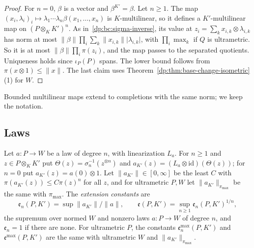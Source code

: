 \documentclass[11pt]{amsart}
\theoremstyle{definition}
\theoremstyle{remark}
\numberwithin{equation}{section}
\newcommand{\id}{\mathrm{id}}
\newcommand{\abs}[1]{\lvert #1\rvert}
\newcommand{\norm}[1]{\lVert #1\rVert}
\theoremstyle{plain}
\theoremstyle{definition}
\theoremstyle{plain}
\begin{document}
\begin{proof}
For $n=0$, $\beta$ is a vector and $\beta^{K'}=\beta$. Let $n\ge1$. The map $(x_i,\lambda_i)_i\mapsto\lambda_1\cdots\lambda_n\beta(x_1,\dots,x_n)$ is $K$-multilinear, so it defines a $K'$-multilinear map on $(P\otimes_KK')^n$. As in~\eqref{dp:bc:sigma-inverse}, its value at $z_i=\sum_kx_{i,k}\otimes\lambda_{i,k}$ has norm at most $\norm\beta\prod_i\sum_k\norm{x_{i,k}}\abs{\lambda_{i,k}}$, with $\prod_i\max_k$ if $Q$ is ultrametric. So it is at most $\norm\beta\prod_i\pi(z_i)$, and the map passes to the separated quotients. Uniqueness holds since $\iota_P(P)$ spans. The lower bound follows from $\pi(x\otimes1)\le\norm x$. The last claim uses Theorem~\ref{dp:thm:base-change-isometric}(1) for $W$.
\end{proof}

Bounded multilinear maps extend to completions with the same norm; we keep the notation.

\subsection{Laws}

Let $a\colon P\to W$ be a law of degree $n$, with linearization $L_a$. For $n\ge1$ and $z\in P\otimes_KK'$ put $\Theta(z)=\sigma_n^{-1}(z^{\otimes n})$ and $a_{K'}(z)=(L_a\otimes\id)(\Theta(z))$; for $n=0$ put $a_{K'}(z)=a(0)\otimes1$. Let $\norm{a_{K'}}\in[0,\infty]$ be the least $C$ with $\pi(a_{K'}(z))\le C\pi(z)^n$ for all $z$, and for ultrametric $P,W$ let $\norm{a_{K'}}_{\pi_{\max}}$ be the same with $\pi_{\max}$. The \emph{extension constants} are
\[
 \mathfrak e_n(P,K')=\sup\norm{a_{K'}}/\norm a,\qquad\mathfrak e(P,K')=\sup_{n\ge1}\mathfrak e_n(P,K')^{1/n},
\]
the supremum over normed $W$ and nonzero laws $a\colon P\to W$ of degree $n$, and $\mathfrak e_n=1$ if there are none. For ultrametric $P$, the constants $\mathfrak e^{\max}_n(P,K')$ and $\mathfrak e^{\max}(P,K')$ are the same with ultrametric $W$ and $\norm{a_{K'}}_{\pi_{\max}}$.
\end{document}
